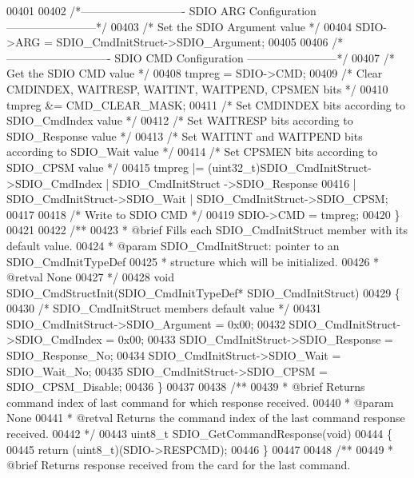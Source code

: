 \begin{DoxyCode}
00401 
00402 \textcolor{comment}{/*---------------------------- SDIO ARG Configuration ------------------------*/}
00403   \textcolor{comment}{/* Set the SDIO Argument value */}
00404   SDIO->ARG = SDIO\_CmdInitStruct->SDIO\_Argument;
00405 
00406 \textcolor{comment}{/*---------------------------- SDIO CMD Configuration ------------------------*/}
00407   \textcolor{comment}{/* Get the SDIO CMD value */}
00408   tmpreg = SDIO->CMD;
00409   \textcolor{comment}{/* Clear CMDINDEX, WAITRESP, WAITINT, WAITPEND, CPSMEN bits */}
00410   tmpreg &= CMD_CLEAR_MASK;
00411   \textcolor{comment}{/* Set CMDINDEX bits according to SDIO\_CmdIndex value */}
00412   \textcolor{comment}{/* Set WAITRESP bits according to SDIO\_Response value */}
00413   \textcolor{comment}{/* Set WAITINT and WAITPEND bits according to SDIO\_Wait value */}
00414   \textcolor{comment}{/* Set CPSMEN bits according to SDIO\_CPSM value */}
00415   tmpreg |= (uint32\_t)SDIO\_CmdInitStruct->SDIO_CmdIndex | SDIO\_CmdInitStruct
      ->SDIO_Response
00416            | SDIO\_CmdInitStruct->SDIO_Wait | SDIO\_CmdInitStruct->SDIO_CPSM;
00417 
00418   \textcolor{comment}{/* Write to SDIO CMD */}
00419   SDIO->CMD = tmpreg;
00420 \}
00421 
00422 \textcolor{comment}{/**}
00423 \textcolor{comment}{  * @brief  Fills each SDIO\_CmdInitStruct member with its default value.}
00424 \textcolor{comment}{  * @param  SDIO\_CmdInitStruct: pointer to an SDIO\_CmdInitTypeDef }
00425 \textcolor{comment}{  *         structure which will be initialized.}
00426 \textcolor{comment}{  * @retval None}
00427 \textcolor{comment}{  */}
00428 \textcolor{keywordtype}{void} SDIO_CmdStructInit(SDIO\_CmdInitTypeDef* SDIO\_CmdInitStruct)
00429 \{
00430   \textcolor{comment}{/* SDIO\_CmdInitStruct members default value */}
00431   SDIO\_CmdInitStruct->SDIO_Argument = 0x00;
00432   SDIO\_CmdInitStruct->SDIO_CmdIndex = 0x00;
00433   SDIO\_CmdInitStruct->SDIO_Response = SDIO_Response_No;
00434   SDIO\_CmdInitStruct->SDIO_Wait = SDIO_Wait_No;
00435   SDIO\_CmdInitStruct->SDIO_CPSM = SDIO_CPSM_Disable;
00436 \}
00437 
00438 \textcolor{comment}{/**}
00439 \textcolor{comment}{  * @brief  Returns command index of last command for which response received.}
00440 \textcolor{comment}{  * @param  None}
00441 \textcolor{comment}{  * @retval Returns the command index of the last command response received.}
00442 \textcolor{comment}{  */}
00443 uint8\_t SDIO_GetCommandResponse(\textcolor{keywordtype}{void})
00444 \{
00445   \textcolor{keywordflow}{return} (uint8\_t)(SDIO->RESPCMD);
00446 \}
00447 
00448 \textcolor{comment}{/**}
00449 \textcolor{comment}{  * @brief  Returns response received from the card for the last command.}

\end{DoxyCode}
